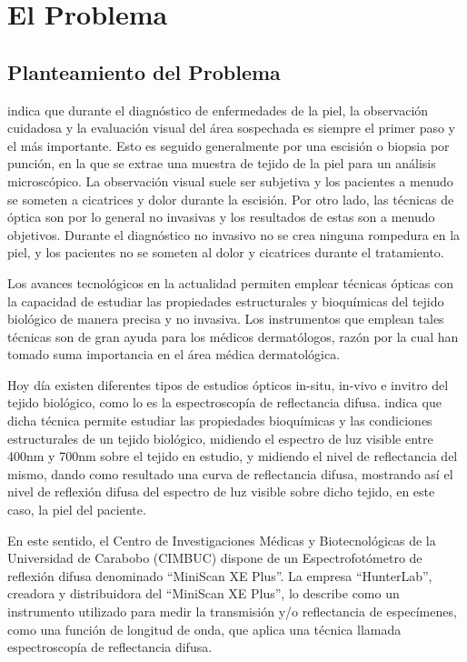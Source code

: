 \chapter{\label{cap:1}El Problema}

	\section{Planteamiento del Problema}	
\cite{Bersha} indica que durante el diagn\'{o}stico de enfermedades de la piel, la observaci\'{o}n cuidadosa y la evaluaci\'{o}n visual del \'{a}rea sospechada es siempre el primer paso y el m\'{a}s importante. Esto es seguido generalmente por una escisi\'{o}n
o biopsia por punci\'{o}n, en la que se extrae una muestra de tejido de la piel para un an\'{a}lisis microsc\'{o}pico. La observaci\'{o}n visual suele ser subjetiva y los pacientes a menudo se someten a cicatrices y dolor durante la escisi\'{o}n. Por otro lado, las t\'{e}cnicas de \'{o}ptica son por lo general no invasivas y los resultados de estas son a menudo objetivos. Durante el diagn\'{o}stico no invasivo no se crea ninguna rompedura en la piel, y los pacientes no se someten al dolor y cicatrices durante el tratamiento.

Los avances tecnol\'{o}gicos en la actualidad permiten emplear t\'{e}cnicas \'{o}pticas con la capacidad de estudiar  las propiedades estructurales y bioqu\'{i}micas del tejido biol\'{o}gico de manera precisa y no invasiva. Los instrumentos que emplean tales t\'{e}cnicas son de gran ayuda para los m\'{e}dicos dermat\'{o}logos, raz\'{o}n por la cual han tomado suma importancia en el \'{a}rea m\'{e}dica dermatol\'{o}gica.

Hoy d\'{i}a existen diferentes tipos de estudios \'{o}pticos in-situ, in-vivo e invitro del tejido biol\'{o}gico, como lo es la espectroscop\'{i}a de reflectancia difusa. \cite{Perez-Gallardo} indica que dicha t\'{e}cnica permite estudiar las propiedades bioqu\'{i}micas y las condiciones estructurales de un tejido biol\'{o}gico, midiendo el espectro de luz visible entre 400nm y 700nm sobre el tejido en estudio, y midiendo el nivel de reflectancia del mismo, dando como resultado una curva de reflectancia difusa, mostrando as\'{i} el nivel de reflexi\'{o}n difusa del espectro de luz visible sobre dicho tejido, en este caso, la piel del paciente.

En este sentido, el Centro de Investigaciones M\'{e}dicas y Biotecnol\'{o}gicas de la Universidad de Carabobo (CIMBUC) dispone de un Espectrofot\'{o}metro de reflexi\'{o}n difusa denominado ``MiniScan XE Plus''. La empresa ``HunterLab'', creadora y distribuidora del ``MiniScan XE Plus'', lo describe como un instrumento utilizado para medir la transmisi\'{o}n y/o reflectancia de espec\'{i}menes, como una funci\'{o}n de longitud de onda, que aplica una t\'{e}cnica llamada espectroscop\'{i}a de reflectancia difusa. 

